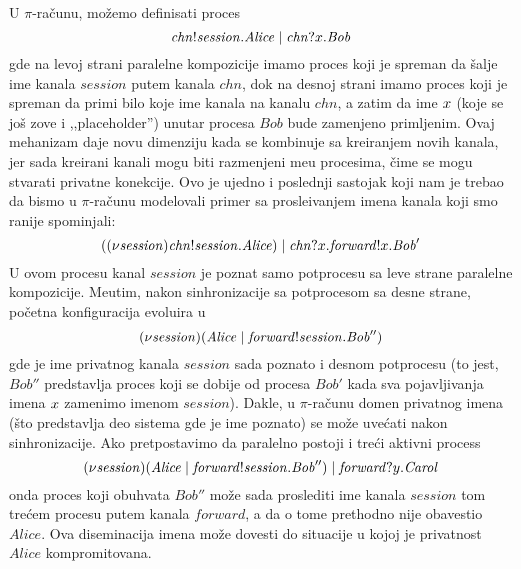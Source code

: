 U $\pi$-ra\v cunu, mo\v zemo definisati proces
\[
\mathit{chn}!\mathit{session}.\mathit{Alice} \;|\; \mathit{chn}?x.\mathit{Bob}
\]
gde na levoj strani paralelne kompozicije imamo proces koji je spreman da \v salje ime kanala $\mathit{session}$ putem kanala $\mathit{chn}$, dok na desnoj strani imamo proces koji je spreman da primi bilo koje ime kanala na kanalu $\mathit{chn}$, a zatim da ime $x$ (koje se jo\v s zove i ,,placeholder'') unutar procesa $\mathit{Bob}$ bude zamenjeno primljenim. 
Ovaj mehanizam daje novu dimenziju kada se kombinuje sa kreiranjem novih kanala, jer sada kreirani kanali mogu biti razmenjeni me\dj u procesima, \v cime se mogu stvarati privatne konekcije. 
Ovo je ujedno i poslednji sastojak koji nam je trebao da bismo u $\pi$-ra\v cunu modelovali primer sa prosle\dj ivanjem imena kanala koji smo ranije spominjali:
\[
((\nu \mathit{session})\mathit{chn}!\mathit{session}.\mathit{Alice}) \;|\; \mathit{chn}?x.\mathit{forward}!x.\mathit{Bob}'
\]
U ovom procesu kanal $\mathit{session}$ je poznat samo potprocesu sa leve strane paralelne kompozicije. Me\dj utim, nakon sinhronizacije sa potprocesom sa desne strane, po\v cetna konfiguracija evoluira u 
\[
(\nu \mathit{session})(\mathit{Alice} \;|\; \mathit{forward}!\mathit{session}.\mathit{Bob}'')
\]
gde je ime privatnog kanala $\mathit{session}$ sada poznato i desnom potprocesu (to jest, $\mathit{Bob}''$ predstavlja proces koji se dobije od procesa  $\mathit{Bob}'$ kada sva pojavljivanja imena $x$ zamenimo imenom $\mathit{session}$). Dakle, u $\pi$-ra\v cunu domen privatnog imena (\v sto predstavlja deo sistema gde je ime poznato) se mo\v ze uve\' cati nakon sinhronizacije. Ako pretpostavimo da paralelno postoji i tre\' ci aktivni process  
\[
(\nu \mathit{session})(\mathit{Alice} \;|\; \mathit{forward}!\mathit{session}.\mathit{Bob}'') \;|\; \mathit{forward}?y.\mathit{Carol}
\]
onda proces koji obuhvata $\mathit{Bob}''$ mo\v ze sada proslediti ime kanala $\mathit{session}$ tom tre\' cem procesu putem kanala $\mathit{forward}$, a da o tome prethodno nije obavestio  $\mathit{Alice}$. Ova diseminacija imena mo\v ze dovesti do situacije u kojoj je privatnost $\mathit{Alice}$ kompromitovana. 

